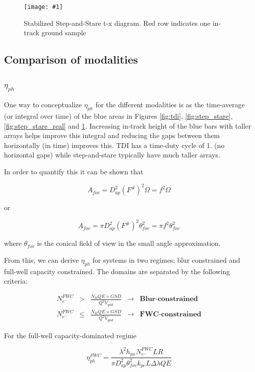 \documentclass[10pt,journal]{IEEEtran}  %
\newcommand{\includefigure}[3]
{
  \begin{figure}[h!]
  \centering
  \texttt{[image: \#1]}
  \caption[]{#3}
  \label{#2}
  \end{figure}
}
\begin{document}
\includefigure{figures/stab_step_stare.pgf}{fig:stab_step_stare}{Stabilized Step-and-Stare t-x diagram.  Red row indicates one in-track ground sample}

\subsection{Comparison of modalities}

\subsubsection{$\eta_{ph}$}

One way to conceptualize $\eta_{ph}$ for the different modalities is as the time-average (or integral over time) of the blue areas in Figures \ref{fig:tdi}, \ref{fig:step_stare}, \ref{fig:step_stare_real} and \ref{fig:stab_step_stare}.  Increasing in-track height of the blue bars with taller arrays helps improve this integral and reducing the gaps between them horizontally (in time) improves this.  TDI has a time-duty cycle of 1. (no horizontal gaps) while step-and-stare typically have much taller arrays.

In order to quantify this it can be shown that

$$A_{fov} = D_{ap}^2 \left(F^\# \right)^2 \Omega = f^2 \Omega $$

or 

$$A_{fov} = \pi D_{ap}^2 \left(F^\# \right)^2 \theta_{fov}^2 = \pi f^2 \theta_{fov}^2$$

where $\theta_{fov}$ is the conical field of view in the small angle approximation.

From this, we can derive $\eta_{ph}$ for systems in two regimes: blur constrained and full-well capacity constrained.  The domains are separated by the following criteria:

\begin{align*}
    N_{e^-}^{FWC} &>& \frac{N_{bl} QE \times GSD}{Q^2 V_{gnd}} & \rightarrow &  \textbf{Blur-constrained} \\
    N_{e^-}^{FWC} &\leq& \frac{N_{bl} QE \times GSD}{Q^2 V_{gnd}} & \rightarrow &  \textbf{FWC-constrained}
\end{align*}

For the full-well capacity-dominated regime

\begin{equation}
    \eta_{ph}^{FWC} = \frac{\lambda^2 h_{px} N_{e^-}^{FWC} LR}{\pi D_{ap}^2 \theta_{fov}^2 k_{pe}L \Delta \lambda QE}
\end{equation}
\end{document}
